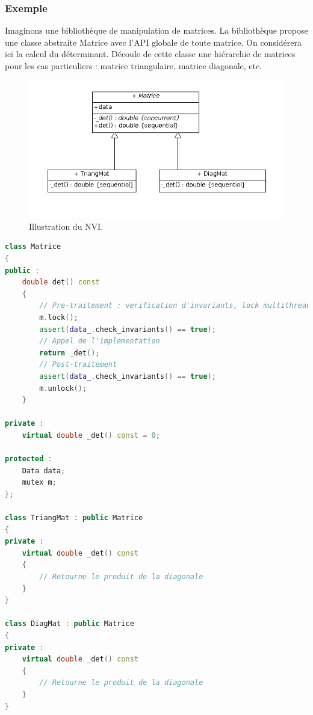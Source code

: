 \subsubsection{Exemple}
Imaginons une bibliothèque de manipulation de matrices. La bibliothèque propose une classe abstraite Matrice avec l'API globale de toute matrice. On considérera ici la calcul du déterminant. Découle de cette classe une hiérarchie de matrices pour les cas particuliers : matrice triangulaire, matrice diagonale, etc.\\

\begin{figure}[!h]\centering
    \includegraphics[scale=0.7]{images/nvi_illu.png}
    \caption{\label{nvi_uml} Illustration du NVI.}
\end{figure}

\begin{lstlisting}[label=nvi_code,caption=NVI : principe.,language=C++]
class Matrice
{
public :
    double det() const
    {
        // Pre-traitement : verification d'invariants, lock multithread, etc.
        m.lock();
        assert(data_.check_invariants() == true);
        // Appel de l'implementation
        return _det();
        // Post-traitement
        assert(data_.check_invariants() == true);
        m.unlock();
    }
    
private :
    virtual double _det() const = 0;
    
protected :
    Data data;
    mutex m;
};

class TriangMat : public Matrice
{
private :
    virtual double _det() const 
    {
        // Retourne le produit de la diagonale
    }
}

class DiagMat : public Matrice
{
private :
    virtual double _det() const 
    {
        // Retourne le produit de la diagonale
    }
}
\end{lstlisting}

